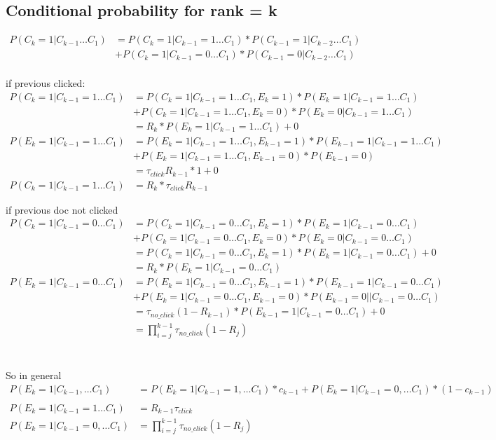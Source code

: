 \subsection {Conditional probability for rank = k}
\begin{align*}
P(C_k = 1 |C_{k-1} \dots C_1)
&= P(C_k = 1 | C_{k-1}=1 \dots C_1) * P(C_{k-1} = 1| C_{k-2} \dots C_1) \\
&+ P(C_k = 1 | C_{k-1}=0 \dots C_1) * P(C_{k-1} = 0| C_{k-2} \dots C_1) \\
\end{align*}

if previous clicked:
\begin{align*}
P(C_k = 1 | C_{k-1}=1 \dots C_1)
&= P(C_k = 1 | C_{k-1}=1 \dots C_1, E_k = 1) * P(E_k = 1 | C_{k-1}=1 \dots C_1) \\
&+ P(C_k = 1 | C_{k-1}=1 \dots C_1, E_k = 0) * P(E_k = 0 | C_{k-1}=1 \dots C_1) \\
&= R_k * P(E_k = 1 | C_{k-1}=1 \dots C_1) + 0 \\
P(E_k = 1 | C_{k-1}=1 \dots C_1) 
&= P(E_k = 1 | C_{k-1}=1 \dots C_1, E_{k-1} = 1) * P(E_{k-1}=1 | C_{k-1}=1 \dots C_1) \\
&+ P(E_k = 1 | C_{k-1}=1 \dots C_1, E_{k-1} = 0) * P(E_{k-1}=0) \\
&= \tau_{click}R_{k-1} * 1 + 0 \\
P(C_k = 1 | C_{k-1}=1 \dots C_1) 
&= R_k * \tau_{click}R_{k-1}
\end{align*}


if previous doc not clicked
\begin{align*}
P(C_k = 1 | C_{k-1}=0 \dots C_1)
&= P(C_k = 1 | C_{k-1}=0 \dots C_1, E_k = 1) * P(E_k = 1 | C_{k-1}=0 \dots C_1) \\
&+ P(C_k = 1 | C_{k-1}=0 \dots C_1, E_k = 0) * P(E_k = 0 | C_{k-1}=0 \dots C_1) \\
&= P(C_k = 1 | C_{k-1}=0 \dots C_1, E_k = 1) * P(E_k = 1 | C_{k-1}=0 \dots C_1) + 0 \\
&= R_k * P(E_k = 1 | C_{k-1}=0 \dots C_1) \\
P(E_k = 1 | C_{k-1}=0 \dots C_1) 
&= P(E_k = 1 | C_{k-1}=0 \dots C_1, E_{k-1} = 1) * P(E_{k-1}=1 | C_{k-1}=0 \dots C_1) \\
&+ P(E_k = 1 | C_{k-1}=0 \dots C_1, E_{k-1} = 0) * P(E_{k-1}=0 | | C_{k-1}=0 \dots C_1) \\
&= \tau_{no\_click}(1-R_{k-1}) * P(E_{k-1}=1 | C_{k-1}=0 \dots C_1) + 0 \\
&= \prod^{k-1}_{i = j}\tau_{no\_click} (1-R_j)
\end{align*}
\\
\\
So in general
\begin{align*}
P(E_k = 1 | C_{k-1}, \dots C_1) &= P(E_k = 1 | C_{k-1} = 1, \dots C_1) * c_{k-1} + P(E_k = 1 | C_{k-1} = 0, \dots C_1) * (1 - c_{k-1}) \\
\\
P(E_k = 1 | C_{k-1} = 1 \dots C_1) &= R_{k-1}\tau_{click} \\
P(E_k = 1 | C_{k-1} = 0, \dots C_1) &= \prod^{k-1}_{i = j}\tau_{no\_click} (1-R_j)
\end{align*} 


